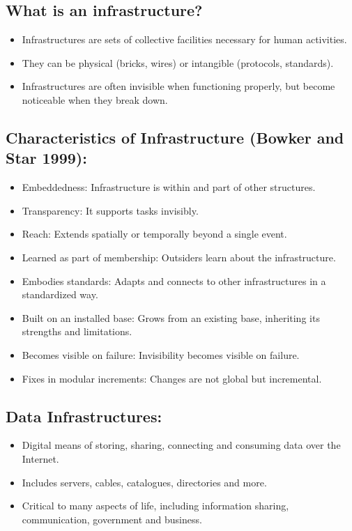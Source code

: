 \documentclass{article}
\begin{document}
\subsection*{What is an infrastructure?}
\begin{itemize}
    \item Infrastructures are sets of collective facilities necessary for human activities.
    \item They can be physical (bricks, wires) or intangible (protocols, standards).
    \item Infrastructures are often invisible when functioning properly, but become noticeable when they break down.
\end{itemize}

\subsection*{Characteristics of Infrastructure (Bowker and Star 1999):}
\begin{itemize}
    \item Embeddedness: Infrastructure is within and part of other structures.
    \item Transparency: It supports tasks invisibly.
    \item Reach: Extends spatially or temporally beyond a single event.
    \item Learned as part of membership: Outsiders learn about the infrastructure.
    \item Embodies standards: Adapts and connects to other infrastructures in a standardized way.
    \item Built on an installed base: Grows from an existing base, inheriting its strengths and limitations.
    \item Becomes visible on failure: Invisibility becomes visible on failure.
    \item Fixes in modular increments: Changes are not global but incremental.
\end{itemize}

\subsection*{Data Infrastructures:}
\begin{itemize}
    \item Digital means of storing, sharing, connecting and consuming data over the Internet.
    \item Includes servers, cables, catalogues, directories and more.
    \item Critical to many aspects of life, including information sharing, communication, government and business.
\end{itemize}
\end{document}

